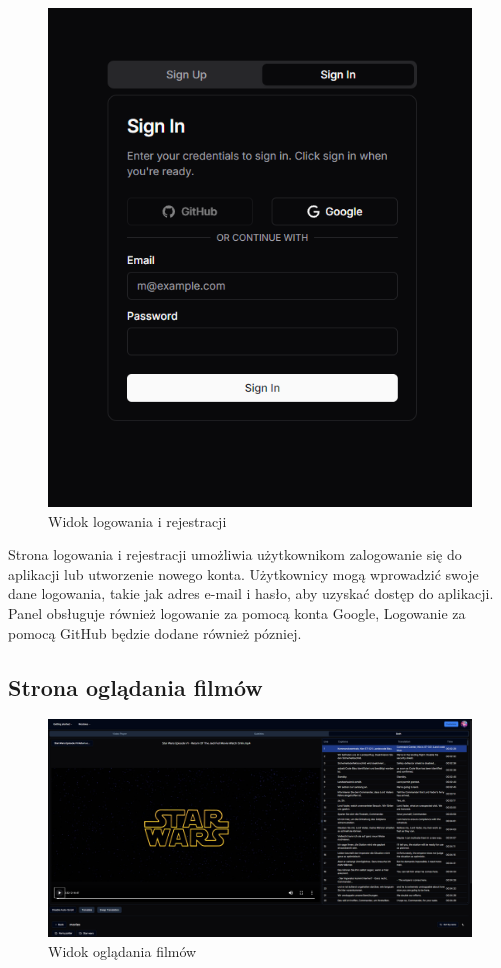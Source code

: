 \begin{figure}[H]
    \centering
    \includegraphics[width=1\textwidth]{IMAGE/LoginPage.png}
    \caption{Widok logowania i rejestracji}
    \label{fig:Logowanie i rejestracja}
\end{figure}
Strona logowania i rejestracji umożliwia użytkownikom zalogowanie się do aplikacji lub utworzenie nowego konta. Użytkownicy mogą wprowadzić swoje dane logowania, takie jak adres e-mail i hasło, aby uzyskać dostęp do aplikacji. Panel obsługuje również logowanie za pomocą konta Google, Logowanie za pomocą GitHub będzie dodane również pózniej.
\subsection{Strona oglądania filmów}


\begin{figure}[H]
    \centering
    \includegraphics[width=1\textwidth]{IMAGE/videoPlayer.png}
    \caption{Widok oglądania filmów}
    \label{fig:oglądanie filmów}
\end{figure}

